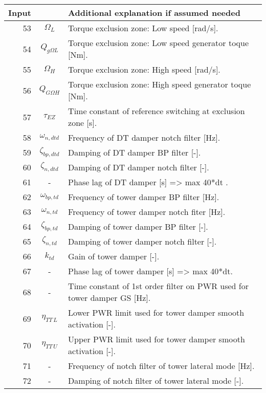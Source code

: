 \begin{table}[t!]
\begin{center}
\begin{tabular}{r|c|p{11.5cm}}
Input &  			& Additional explanation if assumed needed \\ \hline
 53   &	  $\Omega_L$	& Torque exclusion zone: Low speed [rad/s]. \\ 
 54   &  $Q_{g\Omega L}$	& Torque exclusion zone: Low speed generator toque [Nm]. \\ 
 55   &  $\Omega_H$ 	& Torque exclusion zone: High speed [rad/s]. \\ 
 56   &  $Q_{G\Omega H}$& Torque exclusion zone: High speed generator toque [Nm]. \\ 
 57   &	  $\tau_{EZ}$	& Time constant of reference switching at exclusion zone [s]. \\   
\hline
 58  & $\omega_{n,dtd}$ 	& Frequency of DT damper notch filter [Hz]. \\ 
 59  & $\zeta_{bp,dtd}$	& Damping of DT damper BP filter [-]. \\ 
 60  & $\zeta_{n,dtd}$	& Damping of DT damper notch filter [-]. \\ 
 61  & - 			& Phase lag of DT damper [s] =>  max 40*dt . \\ 
\hline
 62  & $\omega_{bp, td}$	& Frequency of tower damper BP filter [Hz]. \\ 
 63  & $\omega_{n, td}$	& Frequency of tower damper notch fiter [Hz]. \\ 
 64  & $\zeta_{bp,td}$	& Damping of tower damper  BP filter [-]. \\ 
 65  & $\zeta_{n,td}$	& Damping of tower damper  notch filter [-]. \\ 
 66  & $k_{td}$ 		& Gain of tower damper  [-]. \\ 
 67  & - 			& Phase lag of tower damper  [s] =>  max 40*dt. \\ 
 68  & - 			& Time constant of 1st order filter on PWR used for tower damper GS [Hz]. \\ 
 69  & $\eta_{TT\,L}$ 	& Lower PWR limit used for tower damper smooth activation [-]. \\ 
 70  & $\eta_{TT\,U}$  	& Upper PWR limit used for tower damper smooth activation [-]. \\ 
\hline
 71  & - 			& Frequency of notch filter of tower lateral mode [Hz]. \\ 
 72  & - 			& Damping of notch filter of tower lateral mode [-]. \\ 
\hline

\end{tabular}
\end{center}
\end{table}
